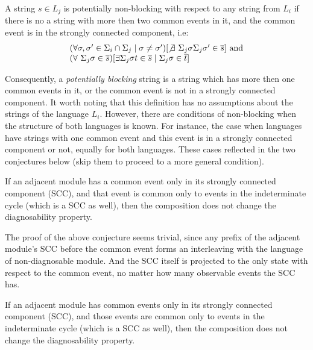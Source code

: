 \documentclass[a4paper, 10pt, conference]{ieeeconf} \IEEEoverridecommandlockouts
\begin{document}
\begin{definition} A string $s \in L_j$ is potentially non-blocking with respect
to any string from $L_i$ if there is no a string with more then two common events
in it, and the common event is in the strongly connected component, i.e:
$$
\begin{array}{l}
	(\forall \sigma, \sigma' \in \Sigma_i \cap \Sigma_j \mid \sigma \neq
	\sigma') 
	[\not \exists ~\Sigma_j \sigma \Sigma_j \sigma' \in \overline{s}]
	\textrm{ and} \\
	(\forall ~\Sigma_j \sigma \in \overline{s}) 
	[\exists \Sigma_j \sigma t \in \overline{s} \mid \Sigma_j \sigma \in \overline{t}]
	
\end{array}
$$
\end{definition}
Consequently, a \emph{potentially blocking} string is a string which has more
then one common events in it, or the common event is not in a strongly connected
component. It worth noting that this definition has no assumptions about the
strings of the language $L_i$. However, there are conditions of non-blocking
when the structure of both languages is known. For instance, the case when 
languages have strings with one common event and this event is in a strongly
connected component or not, equally for both languages. These cases reflected in
the two conjectures below (skip them to proceed to a more general condition).

\begin{conjecture} If an adjacent module has a
common event only in its strongly connected component (SCC), and that event is
common only to events in the indeterminate cycle (which is a SCC as well), then
the composition does not change the diagnosability property.
\end{conjecture} 

The proof of the above conjecture seems trivial, since any prefix of the
adjacent module's SCC before the common event forms an interleaving with the
language of non-diagnosable module. And the SCC itself is projected to the only
state with respect to the common event, no matter how many observable
events the SCC has.

\begin{conjecture} If an adjacent module has 
common events only in its strongly connected component (SCC), and those events
are common only to events in the indeterminate cycle (which is a SCC as well),
then the composition does not change the diagnosability property.
\end{conjecture}
\end{document}
